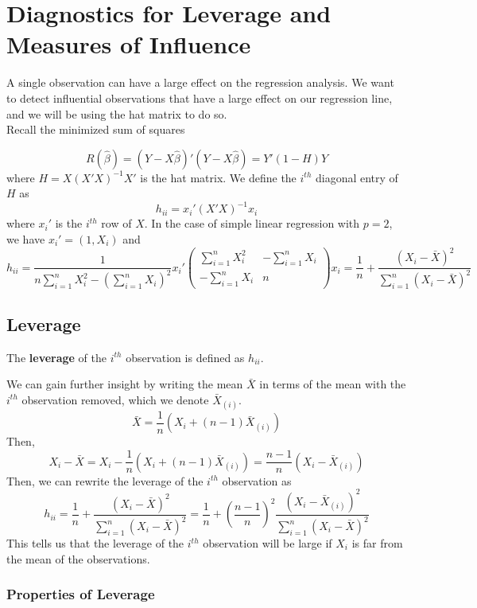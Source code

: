 \chapter{Diagnostics for Leverage and Measures of Influence}

A single observation can have a large effect on the regression analysis. We want to detect influential observations that have a large effect on our regression line, and we will be using the hat matrix to do so. \\

Recall the minimized sum of squares

\[R(\hat{\beta}) = (Y - X\hat{\beta})'(Y - X\hat{\beta}) = Y'(1-H)Y\]
where $H = X(X'X)^{-1}X'$ is the hat matrix. We define the $i^{th}$ diagonal entry of $H$ as 
\[h_{ii} = x_i'(X'X)^{-1}x_i\]
where $x_i'$ is the $i^{th}$ row of $X$. In the case of simple linear regression with $p=2$, we have $x_i' = (1, X_i)$ and
\[h_{ii} = \frac{1}{n\sum_{i=1}^n X_i^2 - \left(\sum_{i=1}^n X_i\right)^2} x_i'\begin{pmatrix}
    \sum_{i=1}^n X_i^2 & -\sum_{i=1}^n X_i \\
    -\sum_{i=1}^n X_i & n
\end{pmatrix}x_i = \frac{1}{n}+\frac{(X_i-\bar{X})^2}{\sum_{i=1}^n(X_i - \bar{X})^2}\]

\section{Leverage}
\begin{definition}
    The \textbf{leverage} of the $i^{th}$ observation is defined as $h_{ii}$.
\end{definition}

We can gain further insight by writing the mean $\bar{X}$ in terms of the mean with the $i^{th}$ observation removed, which we denote $\bar{X}_{(i)}$.
\[\bar{X} = \frac{1}{n}(X_i + (n-1)\bar{X}_{(i)})\]
Then, 
\[X_i - \bar{X} = X_i - \frac{1}{n}\left(X_i + (n-1)\bar{X}_{(i)}\right) = \frac{n-1}{n}(X_i - \bar{X}_{(i)})\]
Then, we can rewrite the leverage of the $i^{th}$ observation as 
\[h_{ii} = \frac{1}{n} + \frac{(X_i-\bar{X})^2}{\sum_{i=1}^n(X_i - \bar{X})^2} = \frac{1}{n}+\left(\frac{n-1}{n}\right)^2 \frac{(X_i-\bar{X}_{(i)})^2}{\sum_{i=1}^n(X_i-\bar{X})^2}\]
\noindent
This tells us that the leverage of the $i^{th}$ observation will be large if $X_i$ is far from the mean of the observations.

\subsection{Properties of Leverage}

